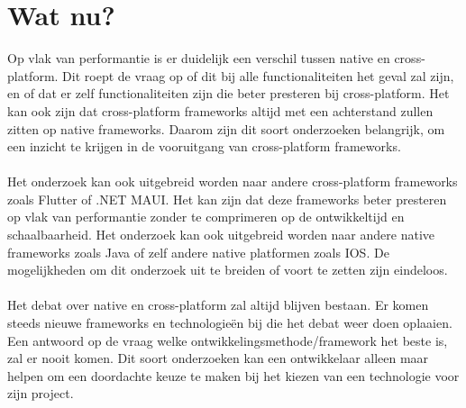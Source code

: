 \section{Wat nu?}
Op vlak van performantie is er duidelijk een verschil tussen native en cross-platform. 
Dit roept de vraag op of dit bij alle functionaliteiten het geval zal zijn, 
en of dat er zelf functionaliteiten zijn die beter presteren bij cross-platform. 
Het kan ook zijn dat cross-platform frameworks altijd met een achterstand zullen zitten op native frameworks.
Daarom zijn dit soort onderzoeken belangrijk, om een inzicht te krijgen in de vooruitgang van cross-platform frameworks.
\\\\
Het onderzoek kan ook uitgebreid worden naar andere cross-platform frameworks zoals Flutter of 
.NET MAUI. Het kan zijn dat deze frameworks beter presteren op vlak van performantie zonder te 
comprimeren op de ontwikkeltijd en schaalbaarheid. Het onderzoek kan ook uitgebreid worden 
naar andere native frameworks zoals Java of zelf andere native platformen zoals IOS. 
De mogelijkheden om dit onderzoek uit te breiden of voort te zetten zijn eindeloos.
\\\\
Het debat over native en cross-platform zal altijd blijven bestaan. Er komen steeds nieuwe frameworks
en technologieën bij die het debat weer doen oplaaien. Een antwoord op de vraag welke 
ontwikkelingsmethode/framework het beste is, zal er nooit komen. Dit soort onderzoeken 
kan een ontwikkelaar alleen maar helpen om een doordachte keuze te maken 
bij het kiezen van een technologie voor zijn project.






